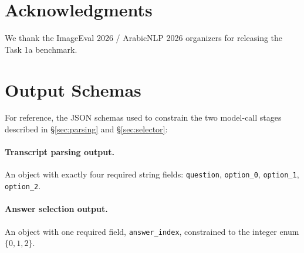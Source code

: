 \documentclass[11pt]{article}
\begin{document}
\section*{Acknowledgments}

We thank the ImageEval 2026 / ArabicNLP 2026 organizers for releasing the Task 1a benchmark.



\appendix

\section{Output Schemas}
\label{sec:appendix-schemas}

For reference, the JSON schemas used to constrain the two model-call stages described in \S\ref{sec:parsing} and \S\ref{sec:selector}:

\paragraph{Transcript parsing output.} An object with exactly four required string fields: \texttt{question}, \texttt{option\_0}, \texttt{option\_1}, \texttt{option\_2}.

\paragraph{Answer selection output.} An object with one required field, \texttt{answer\_index}, constrained to the integer enum $\{0, 1, 2\}$.
\end{document}
